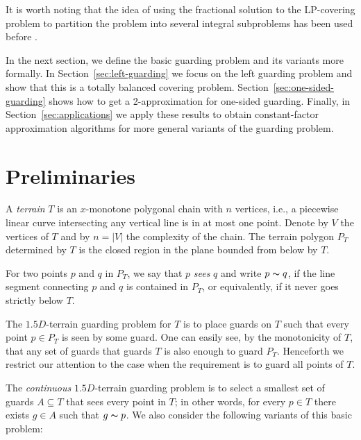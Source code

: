 \documentclass[11pt]{article}
\newcommand{\sees}{\thicksim}
\begin{document}
It is worth noting that the idea of using the fractional solution to the
LP-covering problem to partition the problem into several integral subproblems
has been used before
\cite{journals/orl/HassinS08,conf/stacs/Mestre08,journals/jal/GaurIK02}.

In the next section, we
define the basic guarding problem and its variants
more formally. In Section~\ref{sec:left-guarding} we focus on the left
guarding problem and show that this is a totally balanced covering problem.
Section~\ref{sec:one-sided-guarding} shows how to get a 2-approximation for
one-sided guarding. Finally, in Section~\ref{sec:applications} we apply these
results to obtain constant-factor approximation algorithms for more general variants of
the guarding problem.

\section{Preliminaries}
\label{sec:preliminaries}


A \emph{terrain} $T$ is an $x$-monotone polygonal chain with $n$ vertices,
i.e., a piecewise linear curve intersecting any vertical line is in at most
one point. Denote by $V$ the vertices of $T$ and by $n=|V|$ the complexity of
the chain. The terrain polygon $P_T$ determined by $T$ is the closed region in
the plane bounded from below by $T$.

For two points $p$ and $q$ in $P_T$, we say that $p$ \emph{sees} $q$ and
write $p \sees q$, if the line segment connecting $p$ and $q$ is contained
in $P_T$, or equivalently, if it never goes strictly below $T$.

The $1.5D$-terrain guarding problem for $T$ is to place guards on $T$ such
that every point $p\in P_T$ is seen by some guard. One can easily see, by the
monotonicity of $T$, that any set of guards that guards $T$ is also enough to
guard $P_T$. Henceforth we restrict our attention to the case when the
requirement is to guard all points of $T$.

The \emph{continuous} $1.5D$-terrain guarding problem is to select a smallest
set of guards $A \subseteq T$ that sees every point in $T$; in other words,
for every $p \in T$ there exists $g \in A$ such that $g \sees p$. We also
consider the following variants of this basic problem:
\end{document}
